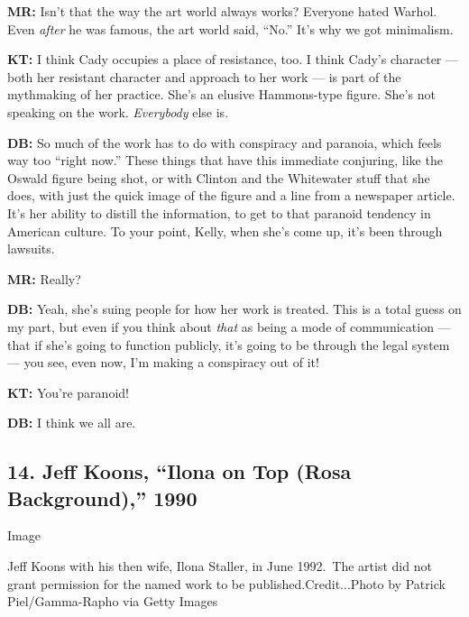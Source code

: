 \textbf{MR:} Isn't that the way the art world always works? Everyone
hated Warhol. Even \emph{after} he was famous, the art world said,
``No.'' It's why we got minimalism.

\textbf{KT:} I think Cady occupies a place of resistance, too. I think
Cady's character --- both her resistant character and approach to her
work --- is part of the mythmaking of her practice. She's an elusive
Hammons-type figure. She's not speaking on the work. \emph{Everybody}
else is.

\textbf{DB:} So much of the work has to do with conspiracy and paranoia,
which feels way too ``right now.'' These things that have this immediate
conjuring, like the Oswald figure being shot, or with Clinton and the
Whitewater stuff that she does, with just the quick image of the figure
and a line from a newspaper article. It's her ability to distill the
information, to get to that paranoid tendency in American culture. To
your point, Kelly, when she's come up, it's been through lawsuits.

\textbf{MR:} Really?

\textbf{DB:} Yeah, she's suing people for how her work is treated. This
is a total guess on my part, but even if you think about \emph{that} as
being a mode of communication --- that if she's going to function
publicly, it's going to be through the legal system --- you see, even
now, I'm making a conspiracy out of it!

\textbf{KT:} You're paranoid!

\textbf{DB:} I think we all are.

\hypertarget{14-jeff-koons-ilona-on-top-rosa-background-1990}{%
\subsection{14. Jeff Koons, ``Ilona on Top (Rosa Background),''
1990}\label{14-jeff-koons-ilona-on-top-rosa-background-1990}}

Image

Jeff Koons with his then wife, Ilona Staller, in June 1992.~The artist
did not grant permission for the named work to be
published.Credit...Photo by Patrick Piel/Gamma-Rapho via Getty Images

